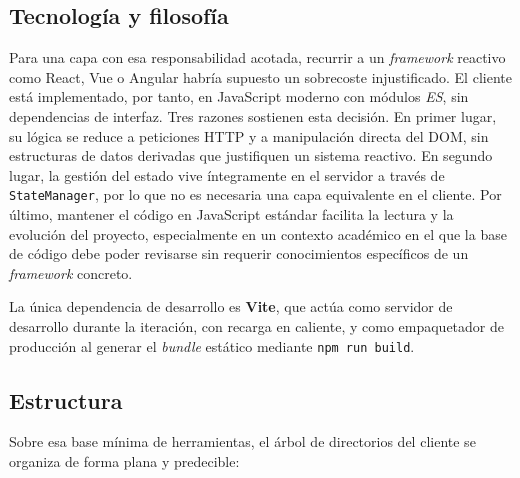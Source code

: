     \subsection*{Tecnología y filosofía}

Para una capa con esa responsabilidad acotada, recurrir a un
\textit{framework} reactivo como React, Vue o Angular habría supuesto
un sobrecoste injustificado. El cliente está implementado, por tanto,
en JavaScript moderno con módulos \textit{ES}, sin dependencias de
interfaz. Tres razones sostienen esta decisión. En primer lugar, su
lógica se reduce a peticiones HTTP y a manipulación directa del DOM,
sin estructuras de datos derivadas que justifiquen un sistema reactivo.
En segundo lugar, la gestión del estado vive íntegramente en el
servidor a través de \texttt{StateManager}, por lo que no es necesaria
una capa equivalente en el cliente. Por último, mantener el código en
JavaScript estándar facilita la lectura y la evolución del proyecto,
especialmente en un contexto académico en el que la base de código
debe poder revisarse sin requerir conocimientos específicos de un
\textit{framework} concreto.

La única dependencia de desarrollo es \textbf{Vite}, que actúa como
servidor de desarrollo durante la iteración, con recarga en caliente,
y como empaquetador de producción al generar el \textit{bundle}
estático mediante \texttt{npm run build}.

    \subsection*{Estructura}

Sobre esa base mínima de herramientas, el árbol de directorios del
cliente se organiza de forma plana y predecible:

